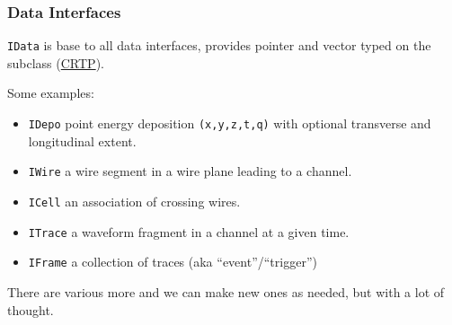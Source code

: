 \documentclass[xcolor=dvipsnames]{beamer}
\begin{document}
\begin{frame}
  \frametitle{Data Interfaces}

  \texttt{IData} is base to all data interfaces, provides pointer and
  vector typed on the subclass
  (\href{https://en.wikipedia.org/wiki/Curiously_recurring_template_pattern}{CRTP}).

  \vfill

  Some examples:

  \begin{itemize}
  \item \texttt{IDepo} point energy deposition \texttt{(x,y,z,t,q)}
    with optional transverse and longitudinal extent.
  \item \texttt{IWire} a wire segment in a wire plane leading to a channel.
  \item \texttt{ICell} an association of crossing wires.
  \item \texttt{ITrace} a waveform fragment in a channel at a given time.
  \item \texttt{IFrame} a collection of traces (aka ``event''/``trigger'')
  \end{itemize}

  \vfill

  \footnotesize There are various more and we can make new ones as
  needed, but with a lot of thought.
\end{frame}
\end{document}
